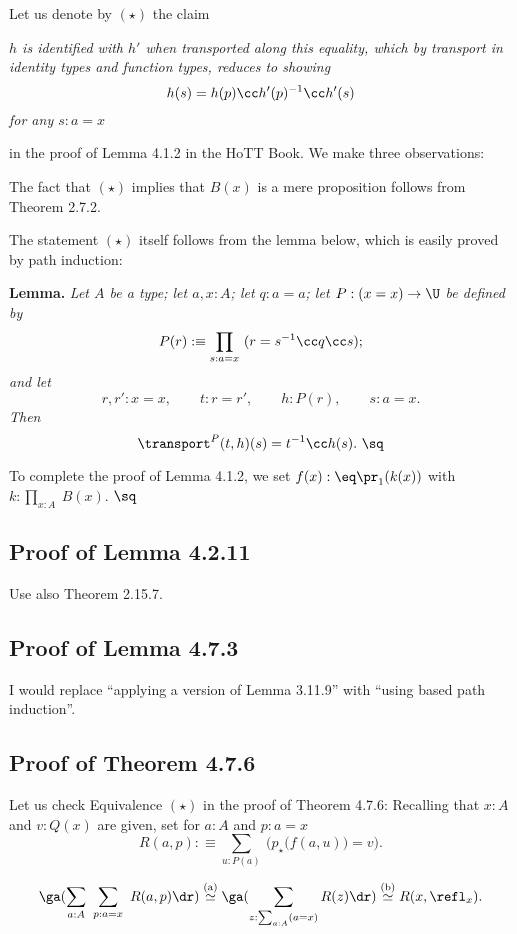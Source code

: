 \documentclass[12pt]{article}
\begin{document}
Let us denote by $(\star)$ the claim 

\nn\emph{$h$ is identified with $h'$ when transported along this equality, which by transport in identity types and function types, reduces to showing 
$$
h(s)=h(p)\cc h'(p)^{-1}\cc h'(s)
$$ 
for any $s:a=x$}

\nn in the proof of Lemma 4.1.2 in the HoTT Book. We make three observations:

\nn{} The fact that $(\star)$ implies that $B(x)$ is a mere proposition follows from Theorem 2.7.2. 

\nn{} The statement $(\star)$ itself follows from the lemma below, which is easily proved by path induction:

\nn\textbf{Lemma.} \emph{Let $A$ be a type; let $a,x:A$; let $q:a=a$; let $P:(x=x)\to\U$ be defined by} 
$$
P(r):\equiv\prod_{s:a=x}\ (r=s^{-1}\cc q\cc s);
$$ 
\emph{and let} 
$$
r,r':x=x,\qquad t:r=r',\qquad h:P(r),\qquad s:a=x.
$$ 
\emph{Then} 
$$
\transport^P(t,h)(s)=t^{-1}\cc h(s).\ \sq
$$ 

\nn{} To complete the proof of Lemma 4.1.2, we set $f(x):\eq\pr_1(k(x))$ with $k:\prod_{x:A}\ B(x)$. $\sq$


\subsection{Proof of Lemma 4.2.11}

Use also Theorem 2.15.7. 


\subsection{Proof of Lemma 4.7.3}

I would replace ``applying a version of Lemma 3.11.9'' with ``using based path induction''.


\subsection{Proof of Theorem 4.7.6}

Let us check Equivalence $(\star)$ in the proof of Theorem 4.7.6: Recalling that $x:A$ and $v:Q(x)$ are given, set for $a:A$ and $p:a=x$ 
$$
R(a,p):\equiv\sum_{u:P(a)}\ \Big(p_\star\big(f(a,u)\big)=v\Big).
$$ 

\nn{}
$$
\ga(\sum_{a:A}\ \sum_{p:a=x}\ R(a,p)\dr)\overset{(\text a)}{\simeq}
\ga(\sum_{z:\sum_{a:A}(a=x)}R(z)\dr)\overset{(\text b)}{\simeq}
R(x,\refl_x).
$$
\end{document}
